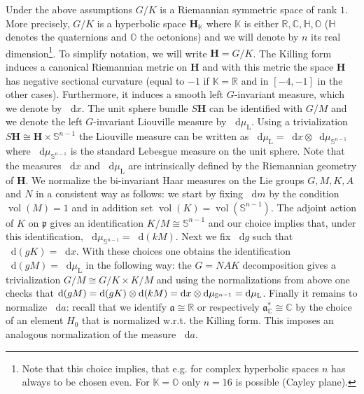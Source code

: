 \documentclass[AHL, Unicode, longabstracts, published]{cedram}
\DeclareMathOperator{\vol}{vol}
\newcommand{\rml}{\mathrm{L}}
\newcommand{\rr}{\mathbb{R}}
\newcommand{\cc}{\mathbb{C}}
\newcommand{\hh}{\mathbb{H}}
\newcommand{\bfh}{\mathbf{H}}
\newcommand{\R}{\mathbb R}
\newcommand{\intd}{\mathop{}\!\mathrm{d}}
\newcommand{\p}{\mathfrak p}
\renewcommand{\a}{\mathfrak a}
\begin{document}
Under the above assumptions $G/K$ is a Riemannian symmetric space of rank $1$. More precisely, $G/K$ is a hyperbolic space ${\bfh}_{\mathbb{K}}$ where $\mathbb{K}$ is either $\rr,\cc,\hh,\mathbb{O}$ ($\hh$ denotes the quaternions and $\mathbb{O}$ the octonions) and we will denote by $n$ its real dimension\footnote{Note that this choice implies, that e.g. for complex hyperbolic spaces $n$ has always to be chosen even. For $\mathbb{K}=\mathbb{O}$ only $n=16$ is possible (Cayley plane).}. To simplify notation, we will write ${\bfh}=G/K$. The Killing form induces a canonical Riemannian metric on ${\bfh}$ and with this metric the space $\bfh$ has negative sectional curvature (equal to $-1$ if $\mathbb{K}=\rr$ and in $[-4,-1]$ in the other cases). Furthermore, it induces a smooth left $G$-invariant measure, which we denote by $\intd x$. The unit sphere bundle $S{\bfh}$ can be identified with $G/M$ and we denote the left $G$-invariant Liouville measure by $\intd\mu_{\rml}$. Using a trivialization $S{\bfh} \cong {\bfh}\times \mathbb S^{n-1}$ the Liouville measure can be written as $\intd \mu_{\rml} = \intd x\otimes\intd \mu_{\mathbb S^{n-1}}$ where $\intd \mu_{\mathbb S^{n-1}}$ is the standard Lebesgue measure on the unit sphere. Note that the measures $\intd x$ and $\intd \mu_{\rml}$ are intrinsically defined by the Riemannian geometry of ${\bfh}$. We normalize the bi-invariant Haar measures on the Lie groups $G,M,K,A$ and $N$ in a consistent way as follows: we start by fixing $\intd m$ by the condition $\vol(M)=1$ and in addition set $\vol(K) = \vol(\mathbb S^ {n-1})$. The adjoint action of $K$ on $\p$ gives an identification $K/M
\cong \mathbb S^{n-1}$ and our choice implies that, under this identification, $\intd \mu_{\mathbb S^ {n-1}} = \intd (kM)$. Next we fix $\intd g$ such that $\intd (gK) = \intd x$. With these choices one obtains the identification $\intd (gM) = \intd \mu_{\rml}$ in the following way: the $G=NAK$ decomposition gives a trivialization $G/M\cong G/K\times K/M$ and using the normalizations from above one checks that $\intd(gM) = \intd (gK)\otimes \intd (kM)\linebreak= \intd x\otimes\intd \mu_{\mathbb S^{n-1}} = \intd \mu_{\rml}$. Finally it remains to normalize $\intd a$: recall that we identify $\a\cong \R$ or respectively $\a^*_\cc\cong \cc$ by the choice of an element $H_0$ that is normalized w.r.t. the Killing form. This imposes an analogous normalization of the measure $\intd a$.
\end{document}
